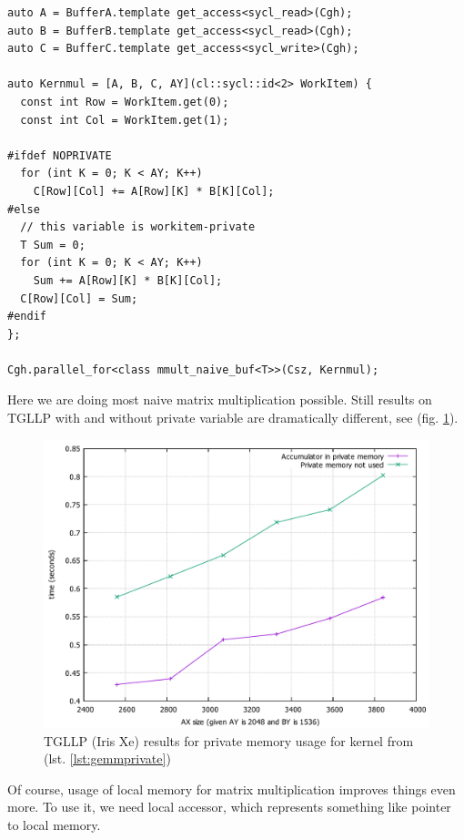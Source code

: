 \documentclass[a4paper,12pt,oneside]{article}
\begin{document}
\begin{lstlisting}[caption={Naive GEMM with private memory},label={lst:gemmprivate}]
auto A = BufferA.template get_access<sycl_read>(Cgh);
auto B = BufferB.template get_access<sycl_read>(Cgh);
auto C = BufferC.template get_access<sycl_write>(Cgh);

auto Kernmul = [A, B, C, AY](cl::sycl::id<2> WorkItem) {
  const int Row = WorkItem.get(0);
  const int Col = WorkItem.get(1);

#ifdef NOPRIVATE
  for (int K = 0; K < AY; K++)
    C[Row][Col] += A[Row][K] * B[K][Col];
#else
  // this variable is workitem-private
  T Sum = 0;
  for (int K = 0; K < AY; K++)
    Sum += A[Row][K] * B[K][Col];
  C[Row][Col] = Sum;
#endif
};

Cgh.parallel_for<class mmult_naive_buf<T>>(Csz, Kernmul);
\end{lstlisting}

Here we are doing most naive matrix multiplication possible. Still results on TGLLP with and without private variable are dramatically different, see (fig. \ref{fig:plot-priv-vs-nopriv-gemm-tgllp}).

\begin{figure}
\centering
\includegraphics[width=1.0\textwidth]{pictures/plot-priv-vs-nopriv-gemm-tgllp.pdf}
\caption{TGLLP (Iris Xe) results for private memory usage for kernel from (lst. \ref{lst:gemmprivate})}
\label{fig:plot-priv-vs-nopriv-gemm-tgllp}
\end{figure}

Of course, usage of local memory for matrix multiplication improves things even more. To use it, we need local accessor, which represents something like pointer to local memory.
\end{document}
